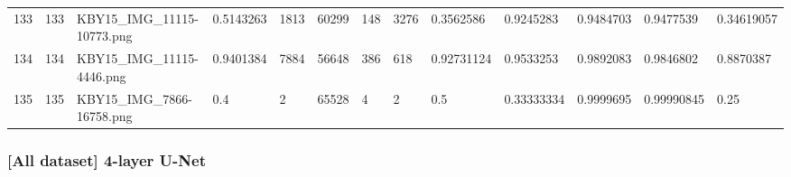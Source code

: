 \documentclass[11pt, a4paper, twoside]{report}
\begin{document}
\begin{longtable}[c]{@{}lllllllllllll@{}}
133 & 133 & KBY15\_IMG\_11115-10773.png & 0.5143263 & 1813 & 60299 & 148 & 3276 & 0.3562586 & 0.9245283 & 0.9484703 & 0.9477539 & 0.34619057 \\
134 & 134 & KBY15\_IMG\_11115-4446.png & 0.9401384 & 7884 & 56648 & 386 & 618 & 0.92731124 & 0.9533253 & 0.9892083 & 0.9846802 & 0.8870387 \\
135 & 135 & KBY15\_IMG\_7866-16758.png & 0.4 & 2 & 65528 & 4 & 2 & 0.5 & 0.33333334 & 0.9999695 & 0.99990845 & 0.25 \\* \bottomrule
\end{longtable}

\newpage

\subsubsection{[All dataset] 4-layer U-Net}
\end{document}
